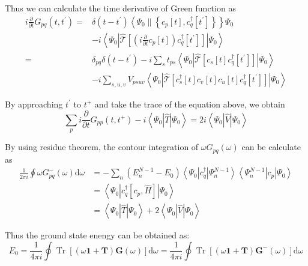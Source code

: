 Thus we can calculate the time derivative of Green function as
\begin{equation}
\begin{aligned} i \frac{\partial}{\partial t} G_{p q}\left(t, t^{\prime}\right)=& \delta\left(t-t^{\prime}\right)\left\langle\Psi_{0} \|\left\{c_{p}[t], c_{q}^{\dagger}\left[t^{\prime}\right]\right\}\right\} \Psi_{0} \\ &-i\left\langle\Psi_{0}\left|\hat{\mathcal{T}}\left[\left(i \frac{\partial}{\partial t} c_{p}[t]\right) c_{q}^{\dagger}\left[t^{\prime}\right]\right]\right| \Psi_{0}\right\rangle \\=& \delta_{p q} \delta\left(t-t^{\prime}\right)-i \sum_{s} t_{p s}\left\langle\Psi_{0}\left|\hat{\mathcal{T}}\left[c_{s}[t] c_{q}^{\dagger}\left[t^{\prime}\right]\right]\right| \Psi_{0}\right\rangle \\ &- i \sum_{s, u, v} V_{p s u v}\left\langle\Psi_{0}\left|\hat{\mathcal{T}}\left[c_{s}^{\dagger}[t] c_{v}[t] c_{u}[t] c_{q}^{\dagger}\left[t^{\prime}\right]\right]\right| \Psi_{0}\right\rangle \end{aligned}
\end{equation}

By approaching $t^{\prime}$ to $t^{+}$ and take the trace of the equation above, we obtain
\begin{equation}
\sum_{p} i \frac{\partial}{\partial t} G_{p p}\left(t, t^{+}\right)-i\left\langle\Psi_{0}|\hat{T}| \Psi_{0}\right\rangle= 2 i\left\langle\Psi_{0}|\hat{V}| \Psi_{0}\right\rangle
\end{equation}

By using residue theorem, the contour integration of $\omega G_{pq}(\omega)$ can be calculate as
\begin{equation}
\begin{aligned}
	\frac{1}{2 \pi i} \oint \omega G_{p q}^{-}(\omega) \mathrm{d} \omega
	&=-\sum_{n}\left(E_{n}^{N-1}-E_{0}\right)\left\langle\Psi_{0}\left|c_{q}^{\dagger}\right| \Psi_{n}^{N-1}\right\rangle\left\langle\Psi_{n}^{N-1}\left|c_{p}\right| \Psi_{0}\right\rangle
\\ 
&=\left\langle\Psi_{0}\left|c_{q}^{\dagger}\left[c_{p}, \hat{H}\right]\right| \Psi_{0}\right\rangle
\\
	&=\left\langle\Psi_{0}|\hat{T}| \Psi_{0}\right\rangle+ 2\left\langle\Psi_{0}|\hat{V}| \Psi_{0}\right\rangle
\end{aligned}
\end{equation}

Thus the ground state enengy can be obtained as:
\begin{equation}
E_{0}=\frac{1}{4 \pi i} \oint \operatorname{Tr}[(\omega \mathbf{1}+\boldsymbol{T}) \boldsymbol{G}(\omega)] \mathrm{d} \omega=\frac{1}{4 \pi i} \oint \operatorname{Tr}\left[(\omega \mathbf{1}+\boldsymbol{T}) \boldsymbol{G}^{-}(\omega)\right] \mathrm{d} \omega
\end{equation}

